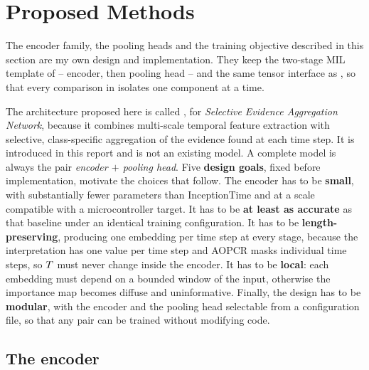 %

\section{Proposed Methods}
\label{sec:methods}

\begin{contribution}
The encoder family, the pooling heads and the training objective described in this section are my
own design and implementation. They keep the two-stage MIL template of  --
encoder, then pooling head -- and the same tensor interface as \millet{}, so that every comparison
in  isolates one component at a time.
\end{contribution}

The architecture proposed here is called \seanet{}, for \emph{Selective Evidence Aggregation
Network}, because it combines multi-scale temporal feature extraction with selective, class-specific
aggregation of the evidence found at each time step. It is introduced in this report and is not an
existing model. A complete \seanet{} model is always the pair
\emph{encoder $+$ pooling head}. Five \textbf{design goals}, fixed before implementation, motivate
the choices that follow. The encoder has to be \textbf{small}, with substantially fewer parameters
than InceptionTime and at a scale compatible with a microcontroller target. It has to be
\textbf{at least as accurate} as that baseline under an identical training configuration. It has to
be \textbf{length-preserving}, producing one embedding per time step at every stage, because the
interpretation has one value per time step and AOPCR masks individual time steps, so $T$ must
never change inside the encoder. It has to be \textbf{local}: each embedding must depend on a
bounded window of the input, otherwise the importance map becomes diffuse and uninformative.
Finally, the design has to be \textbf{modular}, with the encoder and the pooling head selectable
from a configuration file, so that any pair can be trained without modifying code.

\subsection{The \seanet{} encoder}
\label{sec:methods:encoder}


